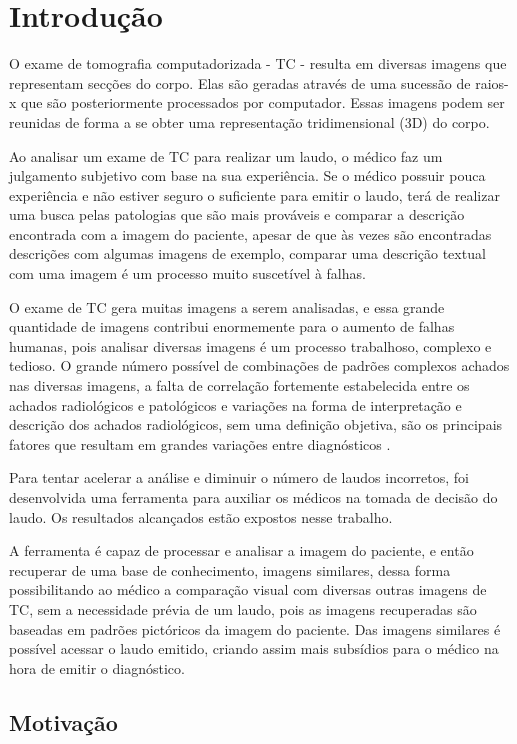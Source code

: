 \chapter{Introdução}

O exame de tomografia computadorizada - TC - resulta em diversas imagens que representam secções do corpo. Elas são geradas através de uma sucessão de raios-x que são posteriormente processados por computador. Essas imagens podem ser reunidas de forma a se obter uma representação tridimensional (3D) do corpo.

Ao analisar um exame de TC para realizar um laudo, o médico faz um julgamento subjetivo com base na sua experiência. Se o médico possuir pouca experiência e não estiver seguro o suficiente para emitir o laudo, terá de realizar uma busca pelas patologias que são mais prováveis e comparar a descrição encontrada com a imagem do paciente, apesar de que às vezes são encontradas descrições com algumas imagens de exemplo, comparar uma descrição textual com uma imagem é um processo muito suscetível à falhas.

O exame de TC gera muitas imagens a serem analisadas, e essa grande quantidade de imagens contribui enormemente para o aumento de falhas humanas, pois analisar diversas imagens é um processo trabalhoso, complexo e tedioso. O grande número possível de combinações de padrões complexos achados nas diversas imagens, a falta de correlação fortemente estabelecida entre os achados radiológicos e patológicos e variações na forma de interpretação e descrição dos achados radiológicos, sem uma definição objetiva, são os principais fatores que resultam em grandes variações entre diagnósticos \cite{uchiyama}.

Para tentar acelerar a análise e diminuir o número de laudos incorretos, foi desenvolvida uma ferramenta para auxiliar os médicos na tomada de decisão do laudo. Os resultados alcançados estão expostos nesse trabalho.

A ferramenta é capaz de processar e analisar a imagem do paciente, e então recuperar de uma base de conhecimento, imagens similares, dessa forma possibilitando ao médico a comparação visual com diversas outras imagens de TC, sem a necessidade prévia de um laudo, pois as imagens recuperadas são baseadas em padrões pictóricos da imagem do paciente. Das imagens similares é possível acessar o laudo emitido, criando assim mais subsídios para o médico na hora de emitir o diagnóstico.

\section{Motivação}

